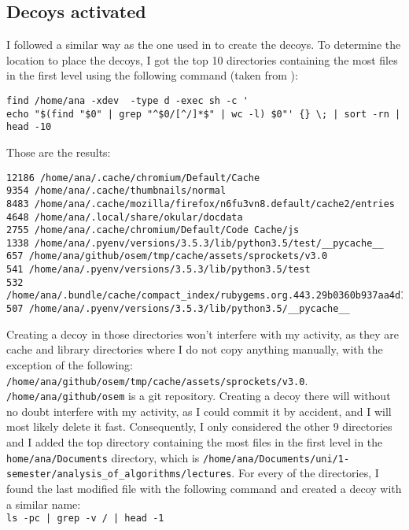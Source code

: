 \documentclass[oneside, 12pt]{article}
\begin{document}
\subsection{Decoys activated}

I followed a similar way as the one used in \cite{ruu_journal} to create the decoys.
To determine the location to place the decoys, I got the top 10 directories containing the most files in the first level using the following command (taken from \cite{stackexchange_122854}):

\begin{lstlisting}[basicstyle=\small\ttfamily]
find /home/ana -xdev  -type d -exec sh -c '
echo "$(find "$0" | grep "^$0/[^/]*$" | wc -l) $0"' {} \; | sort -rn | head -10
\end{lstlisting}

Those are the results:

\begin{lstlisting}[basicstyle=\footnotesize\ttfamily]
12186 /home/ana/.cache/chromium/Default/Cache
9354 /home/ana/.cache/thumbnails/normal
8483 /home/ana/.cache/mozilla/firefox/n6fu3vn8.default/cache2/entries
4648 /home/ana/.local/share/okular/docdata
2755 /home/ana/.cache/chromium/Default/Code Cache/js
1338 /home/ana/.pyenv/versions/3.5.3/lib/python3.5/test/__pycache__
657 /home/ana/github/osem/tmp/cache/assets/sprockets/v3.0
541 /home/ana/.pyenv/versions/3.5.3/lib/python3.5/test
532 /home/ana/.bundle/cache/compact_index/rubygems.org.443.29b0360b937aa4d161703e6160654e47/info
507 /home/ana/.pyenv/versions/3.5.3/lib/python3.5/__pycache__
\end{lstlisting}

Creating a decoy in those directories won't interfere with my activity, as they are cache and library directories where I do not copy anything manually, with the exception of the following:\\
\texttt{/home/ana/github/osem/tmp/cache/assets/sprockets/v3.0}.\\
\texttt{/home/ana/github/osem} is a git repository.
Creating a decoy there will without no doubt interfere with my activity, as I could commit it by accident, and I will most likely delete it fast.
Consequently, I only considered the other 9 directories and I added the top directory containing the most files in the first level in the \texttt{home/ana/Documents} directory, which is \texttt{/home/ana/Documents/uni/1-semester/analysis\_of\_algorithms/lectures}.
For every of the directories, I found the last modified file with the following command and created a decoy with a similar name:\\
\texttt{ls -pc | grep -v / | head -1}\\
\end{document}
